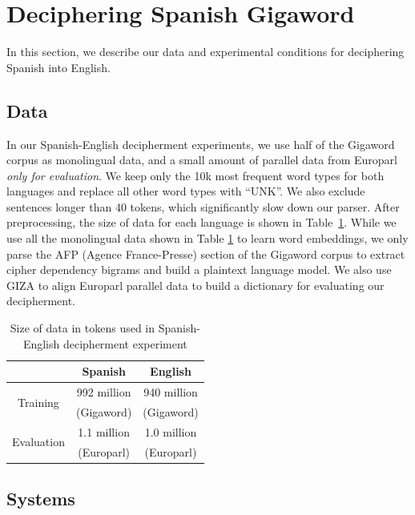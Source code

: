 \section{Deciphering Spanish Gigaword}
\label{decipher_spanish}

In this section, we describe our data and experimental conditions for deciphering Spanish into English.

\subsection{Data}

In our Spanish-English decipherment experiments, we use half of the Gigaword corpus as monolingual data, and a small amount of parallel data from Europarl {\em only for evaluation}. We keep only the 10k most frequent word types for both languages and replace all other word types with ``UNK''.  We also exclude sentences longer than 40 tokens, which significantly slow down our parser. After preprocessing, the size of data for each language is shown in Table~\ref{es-en-data}. 
While we use all the monolingual data shown in Table \ref{es-en-data} to learn word embeddings, we only parse the AFP (Agence France-Presse) section of the Gigaword corpus to extract cipher dependency bigrams and build a plaintext language model. We also use GIZA \cite{GIZA} to align Europarl parallel data to build a dictionary for evaluating our decipherment.

 \begin{table}
 \begin{center}
 \begin{tabular}{ |c|c|c| } \hline
             & Spanish & English \\ \hline
\multirow{2}{*}{Training} & 992 million & 940 million \\ 
 & (Gigaword) & (Gigaword)  \\ \hline
\multirow{2}{*}{Evaluation} & 1.1 million & 1.0 million \\
 & (Europarl) & (Europarl) \\ \hline
 \end{tabular}
 \caption{Size of data in tokens used in Spanish-English decipherment experiment}
 \label{es-en-data}
 \end{center}
 \end{table}

\subsection{Systems}

